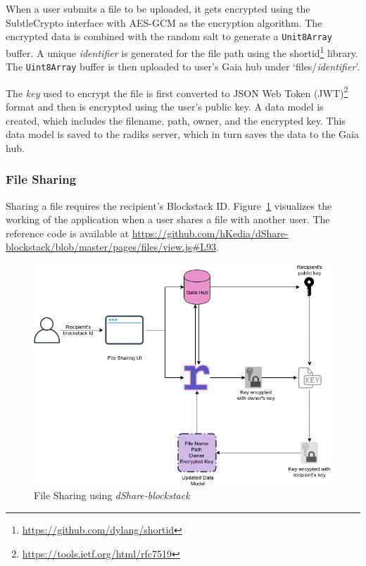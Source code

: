 When a user submits a file to be uploaded, it gets encrypted using the SubtleCrypto interface with AES-GCM as the encryption algorithm. The encrypted data is combined with the random salt to generate a \texttt{Unit8Array} buffer. A unique \textit{identifier} is generated for the file path using the shortid\footnote{\url{https://github.com/dylang/shortid}} library. The \texttt{Uint8Array} buffer is then uploaded to user's Gaia hub under `files/{\textit{identifier}}'.

The \textit{key} used to encrypt the file is first converted to JSON Web Token (JWT)\footnote{\url{https://tools.ietf.org/html/rfc7519}} format and then is encrypted using the user's public key. A data model is created, which includes the filename, path, owner, and the encrypted key. This data model is saved to the radiks server, which in turn saves the data to the Gaia hub.

\subsubsection{File Sharing}
Sharing a file requires the recipient's Blockstack ID. Figure~\ref{fig:blockstack-share} visualizes the working of the application when a user shares a file with another user. The reference code is available at \url{https://github.com/hKedia/dShare-blockstack/blob/master/pages/files/view.js#L93}.

\begin{figure}[h]
	\includegraphics[width=\linewidth]{figures/blockstack-share}
	\caption{\label{fig:blockstack-share} File Sharing using \textit{dShare-blockstack}}
\end{figure}

